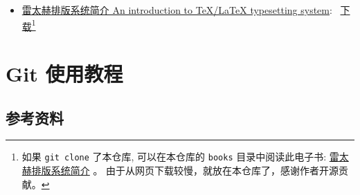 \documentclass[
    11pt,
    base=hide,
    cite=authoryear,
    device=phone,
    lang=cn,
    mode=simple,
    result=answer,
    toc=onecol,
]{elegantsierxue310}
\begin{document}
\begin{itemize}
\begin{itemize}
                \href{https://www.ctan.org/tex-archive/info/lshort/chinese}
                {一份简短的 LaTeX 数学指南}：
                \href{https://wenda.latexstudio.net/article-5006.html}
                {中文下载}\footnote{
                    如果 \lstinline{git clone} 了本仓库,
                    可以在本仓库的 \lstinline{books}
                    目录中阅读此电子书:
                    \href{books/short-math-guide_cn.pdf}
                    {一份简短的 LaTeX 数学指南} 。
                    由于从网页下载较慢，就放在本仓库了，感谢作者开源贡献。
                    }
                ，
                \href{http://mirrors.ustc.edu.cn/CTAN/info/short-math-guide/short-math-guide.pdf}
                {英文下载}\footnote{
                    如果 \lstinline{git clone} 了本仓库,
                    可以在本仓库的 \lstinline{books}
                    目录中阅读此电子书:
                    \href{books/short-math-guide.pdf}
                    {Short Math Guide for \LaTeX{}} 。
                    由于从网页下载较慢，就放在本仓库了，感谢作者开源贡献。
                    }
            \item \href{https://github.com/huangxg/lnotes}
                {雷太赫排版系统简介 An introduction to TeX/LaTeX typesetting system}:~%
                    \href{https://github.com/huangxg/lnotes/raw/master/lnotes2.pdf}
                    {下载}\footnote{
                        如果 \lstinline{git clone} 了本仓库,
                        可以在本仓库的 \lstinline{books}
                        目录中阅读此电子书:
                        \href{books/lnotes2.pdf}{雷太赫排版系统简介} 。
                        由于从网页下载较慢，就放在本仓库了，感谢作者开源贡献。
                        }
        \end{itemize}
\end{itemize}







\chapter{Git 使用教程}%
\label{cha:git-tips}

\section{参考资料}%
\label{sec:git-refs}
\end{document}
